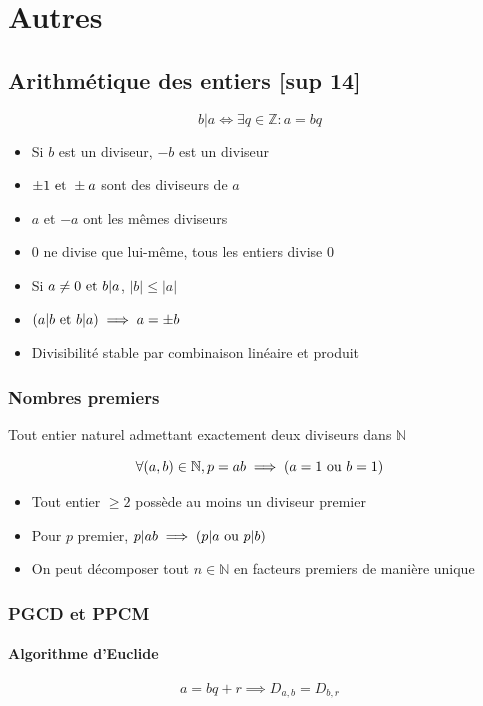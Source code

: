 \documentclass[openany]{book}
\begin{document}
\clearpage


\chapter{Autres}
\section{Arithmétique des entiers [sup 14]}
\[ b|a \iff \exists q \in \mathbb{Z} : a = bq \]

\begin{itemize}
    \item Si $b$ est un diviseur, $-b$ est un diviseur
    \item $\pm 1 \text{ et } \pm a $ sont des diviseurs de $a$
    \item $a$ et $-a$ ont les mêmes diviseurs
    \item 0 ne divise que lui-même, tous les entiers divise 0
    \item Si $ a \neq 0 \text{ et } b | a $, $|b| \leq |a|$
    \item $(a|b \text{ et } b|a) \implies a = \pm b$
    \item Divisibilité stable par combinaison linéaire et produit
\end{itemize}

\subsection{Nombres premiers}
Tout entier naturel admettant exactement deux diviseurs dans $\mathbb{N}$

\[ \forall (a, b) \in \mathbb{N}, p = ab \implies (a = 1 \text{ ou } b = 1) \]

\begin{itemize}
    \item Tout entier $\geq 2$ possède au moins un diviseur premier
    \item Pour $p$ premier, $p | ab \implies (p | a \text{ ou } p | b) $
    \item On peut décomposer tout $n \in \mathbb{N}$ en facteurs premiers de manière unique
\end{itemize}

\subsection{PGCD et PPCM}
\subsubsection{Algorithme d'Euclide}
\[ a = bq + r \implies D_{a, b} = D_{b, r} \]
\end{document}
